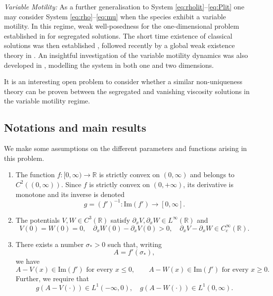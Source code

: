 \documentclass[a4paper,twosided, 11pt]{article}
\newcommand{\R}{\mathbb{R}}
\theoremstyle{plain}
\theoremstyle{remark}
\numberwithin{equation}{section}
\begin{document}
\medskip 

\emph{Variable Motility:} As a further generalisation to System \eqref{eq:rholit}--\eqref{eq:Plit} one may consider System \eqref{eq:rho}--\eqref{eq:mu} when the species exhibit a variable motility.
In this regime, weak well-posedness for the one-dimensional problem established in \cite{BertschGurtin87VariableMotility} for segregated solutions. 
The short time existence of classical solutions was then established \cite{DruetHopfJungel23}, followed recently by a global weak existence theory in \cite{ElbarMotility26}. An insightful investigation of the variable motility dynamics was also developed in \cite{LorenziLorzPerthame17}, modelling the system in both one and two dimensions.


\medskip

It is an interesting open problem to consider whether a similar non-uniqueness theory can be proven between the segregated and vanishing viscosity solutions in the variable motility regime. 


\subsection{Notations and main results}
We make some assumptions on the different parameters and functions arising in this problem. 

\begin{enumerate}[label=(A\arabic*)]
\item\label{ass:f} The function $f\colon[0,\infty)\to\R$ is strictly convex on $(0,\infty)$ and belongs to $C^2((0,\infty))$.
Since $f$ is strictly convex on $(0,+\infty)$, its derivative is monotone and its inverse is denoted
$$
g=(f')^{-1}\colon \mathrm{Im}(f') \to[0,\infty].
$$
\item\label{ass:VW} The potentials $V,W\in C^3(\R)$ satisfy $\partial_x V, \partial_x W  \in L^\infty(\R)$ and
$$
V(0)=W(0)=0, \quad
\partial_x W(0)-\partial_x V(0)>0, \quad 
\partial_x V-\partial_x W\in C_c^{\infty}(\R).
$$

\item\label{ass:sigma} There exists a number $\sigma_*>0$ such that, writing
$$
A=f'(\sigma_*),
$$
we have
$$
A-V(x) \in \mathrm{Im}(f') \text{ for every } x \leq 0, \quad \quad   A-W(x) \in \mathrm{Im}(f') \text{ for every } x \geq 0.
$$
Further, we require that
$$
g\left(A-V(\cdot)\right)\in L^1(-\infty,0), \quad g\left(A-W(\cdot)\right)\in L^1(0,\infty).
$$
\end{enumerate}
\end{document}
